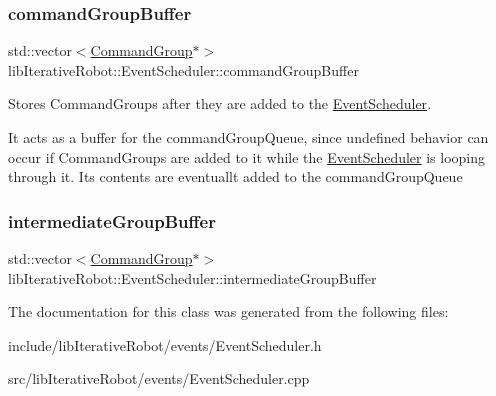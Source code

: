 \subsubsection{\texorpdfstring{commandGroupBuffer}{commandGroupBuffer}}
{\footnotesize\ttfamily std\+::vector$<$\mbox{\hyperlink{classlib_iterative_robot_1_1_command_group}{Command\+Group}}$\ast$$>$ lib\+Iterative\+Robot\+::\+Event\+Scheduler\+::command\+Group\+Buffer\hspace{0.3cm}{\ttfamily [private]}}



Stores Command\+Groups after they are added to the \mbox{\hyperlink{classlib_iterative_robot_1_1_event_scheduler}{Event\+Scheduler}}. 

It acts as a buffer for the command\+Group\+Queue, since undefined behavior can occur if Command\+Groups are added to it while the \mbox{\hyperlink{classlib_iterative_robot_1_1_event_scheduler}{Event\+Scheduler}} is looping through it. Its contents are eventuallt added to the command\+Group\+Queue \mbox{\label{classlib_iterative_robot_1_1_event_scheduler_a4a5d6ac28a4a988e4350b060f7214b3d}} 
\subsubsection{\texorpdfstring{intermediateGroupBuffer}{intermediateGroupBuffer}}
{\footnotesize\ttfamily std\+::vector$<$\mbox{\hyperlink{classlib_iterative_robot_1_1_command_group}{Command\+Group}}$\ast$$>$ lib\+Iterative\+Robot\+::\+Event\+Scheduler\+::intermediate\+Group\+Buffer\hspace{0.3cm}{\ttfamily [private]}}



The documentation for this class was generated from the following files\+:\begin{DoxyCompactItemize}
\item 
include/lib\+Iterative\+Robot/events/Event\+Scheduler.\+h\item 
src/lib\+Iterative\+Robot/events/Event\+Scheduler.\+cpp\end{DoxyCompactItemize}
